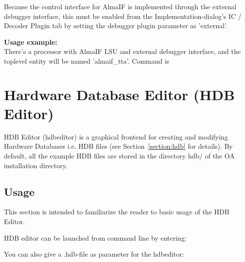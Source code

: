 \documentclass[a4paper,twoside]{tceusermanual}
\begin{document}
Because the control interface for AlmaIF is implemented through the external
debugger interface, this must be enabled from the Implementation-dialog's
IC / Decoder Plugin tab by setting the debugger plugin parameter as 'external'.

\textbf{Usage example:} \\
There's a processor with AlmaIF LSU and external debugger interface, and the
toplevel entity will be named 'almaif\_tta'. Command is



\section{Hardware Database Editor (HDB Editor)}
\label{sec:hdbedit}
 

HDB Editor (hdbeditor) is a graphical frontend for creating and
modifying Hardware Databases i.e. HDB files (see Section~\ref{section:hdb}
for details). By default, all the example HDB files are stored in the directory
hdb/ of the OA installation directory.

\subsection{Usage}

This section is intended to familiarize the reader to basic usage of the HDB
Editor.

HDB editor can be launched from command line by entering:


You can also give a .hdb-file as parameter for the hdbeditor:

\end{document}
